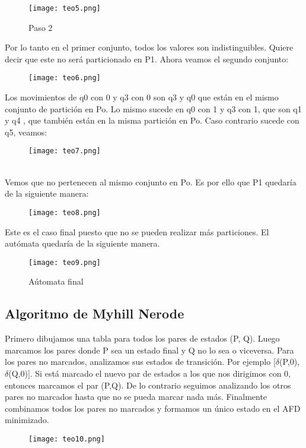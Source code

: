 \documentclass[12pt]{article}
\begin{document}
\begin{figure}[h]
    \centering
    \texttt{[image: teo5.png]}
    \caption{Paso 2}
    \label{fig:my_label}
\end{figure}

 Por lo tanto en el primer conjunto, todos los valores son indistinguibles. Quiere decir que este no será particionado en P1. 
 Ahora veamos el segundo conjunto:

\begin{figure}[h]
    \centering
    \texttt{[image: teo6.png]}
    \caption{}
    \label{fig:my_label}
\end{figure}

Los movimientos de q0 con 0 y q3 con 0 son q3 y q0 que están en el mismo conjunto de partición en Po. Lo mismo sucede en q0 con 1 y q3 con 1, que son q1 y q4 , que también están en la misma partición en Po.
Caso contrario sucede con q5, veamos:

\begin{figure}[h]
    \centering
    \texttt{[image: teo7.png]}
    \caption{}
    \label{fig:my_label}
\end{figure}
\\
Vemos que no pertenecen al mismo conjunto en Po. Es por ello que P1 quedaría de la siguiente manera:

\begin{figure}[h]
    \centering
    \texttt{[image: teo8.png]}
\end{figure}    


\newpage
Este es el caso final puesto que no se pueden realizar más particiones. El autómata quedaría de la siguiente manera.

\begin{figure}[h]
    \centering
    \texttt{[image: teo9.png]}
    \caption{A\'utomata final}
    \label{fig:my_label}
\end{figure}

\subsection{Algoritmo de Myhill Nerode}

Primero dibujamos una tabla para todos los pares de estados (P, Q). Luego marcamos los pares donde P sea un estado final y Q no lo sea o viceversa. Para los pares no marcados, analizamos sus estados de transici\'on. Por ejemplo [$\delta$(P,0), $\delta$(Q,0)]. Si est\'a marcado el nuevo par de estados a los que nos dirigimos con 0, entonces marcamos el par (P,Q). De lo contrario seguimos analizando los otros pares no marcados hasta que no se pueda marcar nada m\'as. Finalmente combinamos todos los pares no marcados y formamos un único estado en el AFD minimizado.

\begin{figure}[h]
    \centering
    \texttt{[image: teo10.png]}
    \label{fig:my_label}
\end{figure}
\end{document}
